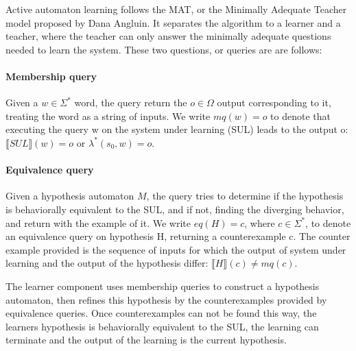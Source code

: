 Active automaton learning follows the MAT, or the Minimally Adequate Teacher model proposed by Dana Angluin\cite{ANGLUIN198787}. It separates the algorithm to a learner and a teacher, where the teacher can only answer the minimally adequate questions needed to learn the system. These two questions, or queries are are follows:


\paragraph{Membership query} Given a $w\in\Sigma^{*}$ word, the query return the $o\in \Omega$ output corresponding to it, treating the word as a string of inputs. We write $mq(w) = o$ to denote that executing the query w on the system under learning (SUL) leads to the output o: $\llbracket SUL \rrbracket(w) = o$ or $\lambda^*(s_0, w) = o$.

\paragraph{Equivalence query} Given a hypothesis automaton $M$, the query tries to determine if the hypothesis is behaviorally equivalent to the SUL, and if not, finding the diverging behavior, and return with the example of it. We write $eq(H) = c$, where $c\in\Sigma^*$, to denote an equivalence query on hypothesis H, returning a counterexample c. The counter example provided is the sequence of inputs for which the output of system under learning and the output of the hypothesis differ: $ \llbracket H\rrbracket(c) \neq mq(c)$.

\noindent The learner component uses membership queries to construct a hypothesis automaton, then refines this hypothesis by the counterexamples provided by equivalence queries. Once counterexamples can not be found this way, the learners hypothesis is behaviorally equivalent to the SUL, the learning can terminate and the output of the learning is the current hypothesis.

